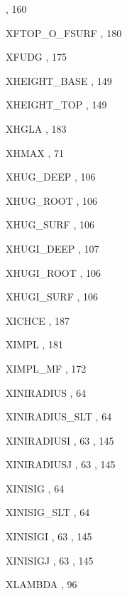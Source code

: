 \begin{theindex}
    \subitem {},  160
  \item XFTOP\_O\_FSURF
    \subitem {},  180
  \item XFUDG
    \subitem {},  175
  \item XHEIGHT\_BASE 
    \subitem {},  149
  \item XHEIGHT\_TOP 
    \subitem {},  149
  \item XHGLA
    \subitem {},  183
  \item XHMAX
    \subitem {},  71
  \item XHUG\_DEEP
    \subitem {},  106
  \item XHUG\_ROOT
    \subitem {},  106
  \item XHUG\_SURF
    \subitem {},  106
  \item XHUGI\_DEEP
    \subitem {},  107
  \item XHUGI\_ROOT
    \subitem {},  106
  \item XHUGI\_SURF
    \subitem {},  106
  \item XICHCE
    \subitem {},  187
  \item XIMPL
    \subitem {},  181
  \item XIMPL\_MF
    \subitem {},  172
  \item XINIRADIUS
    \subitem {},  64
  \item XINIRADIUS\_SLT
    \subitem {},  64
  \item XINIRADIUSI
    \subitem {},  63
    \subitem {},  145
  \item XINIRADIUSJ
    \subitem {},  63
    \subitem {},  145
  \item XINISIG
    \subitem {},  64
  \item XINISIG\_SLT
    \subitem {},  64
  \item XINISIGI
    \subitem {},  63
    \subitem {},  145
  \item XINISIGJ
    \subitem {},  63
    \subitem {},  145
  \item XLAMBDA
    \subitem {},  96

\end{theindex}
